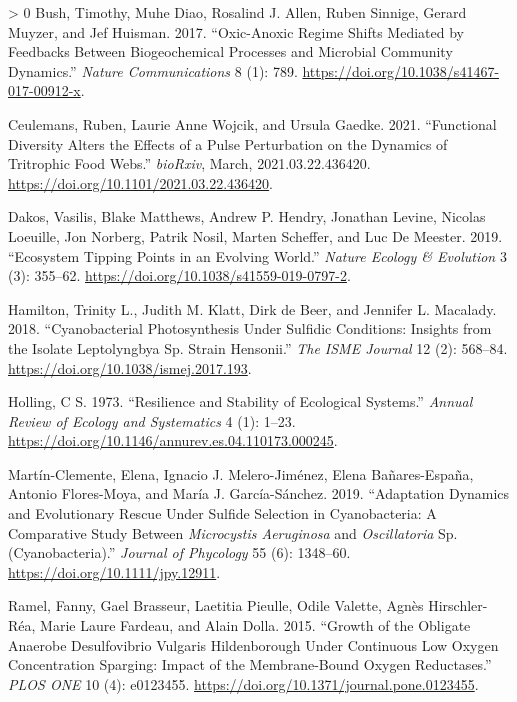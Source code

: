 \documentclass{article}
\newlength{\cslhangindent}
\newenvironment{CSLReferences}[3] %
 {%
  \setlength{\parindent}{0pt}
  \ifodd #1 \everypar{\setlength{\hangindent}{\cslhangindent}}\ignorespaces\fi
  \ifnum #2 > 0
  \setlength{\parskip}{#2\baselineskip}
  \fi
 }%
 {}
\begin{document}
\hypertarget{refs}{}
\begin{CSLReferences}{1}{0}
\leavevmode\hypertarget{ref-bush2017}{}%
Bush, Timothy, Muhe Diao, Rosalind J. Allen, Ruben Sinnige, Gerard
Muyzer, and Jef Huisman. 2017. {``Oxic-Anoxic Regime Shifts Mediated by
Feedbacks Between Biogeochemical Processes and Microbial Community
Dynamics.''} \emph{Nature Communications} 8 (1): 789.
\url{https://doi.org/10.1038/s41467-017-00912-x}.

\leavevmode\hypertarget{ref-ceulemans2021}{}%
Ceulemans, Ruben, Laurie Anne Wojcik, and Ursula Gaedke. 2021.
{``Functional Diversity Alters the Effects of a Pulse Perturbation on
the Dynamics of Tritrophic Food Webs.''} \emph{bioRxiv}, March,
2021.03.22.436420. \url{https://doi.org/10.1101/2021.03.22.436420}.

\leavevmode\hypertarget{ref-dakos2019b}{}%
Dakos, Vasilis, Blake Matthews, Andrew P. Hendry, Jonathan Levine,
Nicolas Loeuille, Jon Norberg, Patrik Nosil, Marten Scheffer, and Luc De
Meester. 2019. {``Ecosystem Tipping Points in an Evolving World.''}
\emph{Nature Ecology \& Evolution} 3 (3): 355--62.
\url{https://doi.org/10.1038/s41559-019-0797-2}.

\leavevmode\hypertarget{ref-hamilton2018}{}%
Hamilton, Trinity L., Judith M. Klatt, Dirk de Beer, and Jennifer L.
Macalady. 2018. {``Cyanobacterial Photosynthesis Under Sulfidic
Conditions: Insights from the Isolate Leptolyngbya Sp. Strain
Hensonii.''} \emph{The ISME Journal} 12 (2): 568--84.
\url{https://doi.org/10.1038/ismej.2017.193}.

\leavevmode\hypertarget{ref-holling1973}{}%
Holling, C S. 1973. {``Resilience and Stability of Ecological
Systems.''} \emph{Annual Review of Ecology and Systematics} 4 (1):
1--23. \url{https://doi.org/10.1146/annurev.es.04.110173.000245}.

\leavevmode\hypertarget{ref-martuxednclemente2019}{}%
Martín-Clemente, Elena, Ignacio J. Melero-Jiménez, Elena Bañares-España,
Antonio Flores-Moya, and María J. García-Sánchez. 2019. {``Adaptation
Dynamics and Evolutionary Rescue Under Sulfide Selection in
Cyanobacteria: A Comparative Study Between {\emph{Microcystis
Aeruginosa}} and {\emph{Oscillatoria}} Sp. (Cyanobacteria).''}
\emph{Journal of Phycology} 55 (6): 1348--60.
\url{https://doi.org/10.1111/jpy.12911}.

\leavevmode\hypertarget{ref-ramel2015}{}%
Ramel, Fanny, Gael Brasseur, Laetitia Pieulle, Odile Valette, Agnès
Hirschler-Réa, Marie Laure Fardeau, and Alain Dolla. 2015. {``Growth of
the Obligate Anaerobe Desulfovibrio Vulgaris Hildenborough Under
Continuous Low Oxygen Concentration Sparging: Impact of the
Membrane-Bound Oxygen Reductases.''} \emph{PLOS ONE} 10 (4): e0123455.
\url{https://doi.org/10.1371/journal.pone.0123455}.


\end{CSLReferences}
\end{document}
